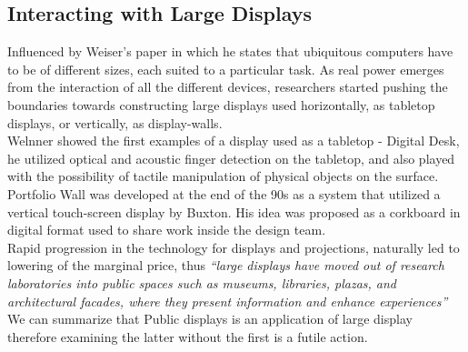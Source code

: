 \subsection{Interacting with Large Displays}
Influenced by Weiser's paper \cite{Weiser:1991} in which he states that ubiquitous computers have to be of different sizes, each suited to a particular task. 
As real power emerges from the interaction of all the different devices, researchers started pushing the boundaries towards constructing large displays used horizontally, as tabletop displays, or vertically, as display-walls.\\
 
Welnner showed the first examples of a display used as a tabletop -  Digital Desk\cite{Wellner:1993}, he utilized optical and acoustic finger detection on the tabletop, and also played with the possibility of tactile manipulation of physical objects on the surface. Portfolio Wall was developed at the end of the 90s as a system that utilized a vertical touch-screen display by Buxton\cite{Buxton:2000}. His idea was proposed as a corkboard in digital format used to share work inside the design team.\\

Rapid progression in the technology for displays and projections, naturally led to lowering of the marginal price, thus \emph{``large displays have moved out of research laboratories into public spaces such as museums, libraries, plazas, and architectural facades, where they present information and enhance experiences''} \cite{Hinrichs:2013:IPD:2478559.2478965}\\

We can summarize that Public displays is an application of large display therefore examining the latter without the first is a futile action.